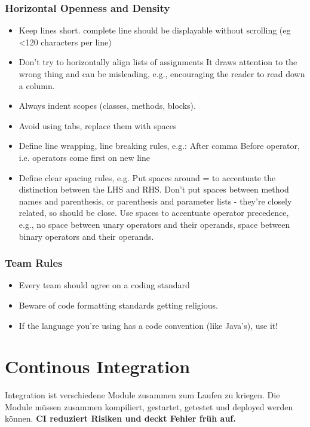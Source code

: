 \documentclass[10pt]{article}
\begin{document}
    \subsubsection{Horizontal Openness and Density}
    \begin{itemize}
        \item Keep lines short.
        \subitem complete line should be displayable without scrolling (eg <120 characters per line)
        \item Don\textquoteright t try to horizontally align lists of assignments
        \subitem It draws attention to the wrong thing and can be misleading, e.g., encouraging the reader to read down a column.
        \item Always indent scopes (classes, methods, blocks).
        \item Avoid using tabs, replace them with spaces
        \item Define line wrapping, line breaking rules, e.g.:
        \subitem After comma
        \subitem Before operator, i.e. operators come first on new line
        \item Define clear spacing rules, e.g.
        \subitem Put spaces around = to accentuate the distinction between the LHS and RHS.
        \subitem Don\textquoteright t put spaces between method names and parenthesis, or parenthesis and parameter lists - they\textquoteright re closely related, so should be close.
        \subitem Use spaces to accentuate operator precedence, e.g., no space between unary operators and their operands, space between binary operators and their operands.
    \end{itemize}

    \subsubsection{Team Rules}
    \begin{itemize}
        \item Every team should agree on a coding standard
        \item Beware of code formatting standards getting religious.
        \item If the language you\textquoteright re using has a code convention (like Java\textquoteright s), use it!
    \end{itemize}
	\newpage
	

    \section{Continous Integration}
    Integration ist verschiedene Module zusammen zum Laufen zu kriegen. Die Module m\"ussen zusammen kompiliert, gestartet, getestet und deployed werden k\"onnen. \textbf{CI reduziert Risiken und deckt Fehler fr\"uh auf.}
\end{document}
